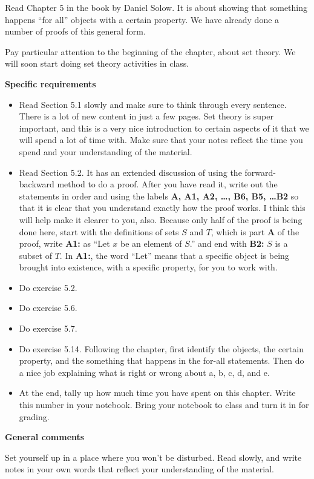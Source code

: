 
Read Chapter 5 in the book by Daniel Solow.
It is about showing that something happens ``for all'' objects with a certain property.
We have already done a number of proofs of this general form.

Pay particular attention to the beginning of the chapter, about set theory.
We will soon start doing set theory activities in class.

\vspace{0.1in}
\noindent
{\bf Specific requirements}
\vspace*{-0.15in}

\begin{itemize}
\item Read Section 5.1 slowly and make sure to think through every sentence.
There is a lot of new content in just a few pages.
Set theory is super important, and this is a very nice introduction to certain aspects of it that we will spend a lot of time with.
Make sure that your notes reflect the time you spend and your understanding of the material.

\item Read Section 5.2.  It has an extended discussion of using the forward-backward method to do a proof.
After you have read it, write out the statements in order and using the labels {\bf A, A1, A2, \ldots, B6, B5, \ldots B2} so that it is clear that you understand exactly how the proof works.
I think this will help make it clearer to you, also.
Because only half of the proof is being done here, start with the definitions of sets $S$ and $T$, which is part {\bf A} of the proof, write {\bf A1:} as ``Let $x$ be an element of $S$.'' and end with {\bf B2:} $S$ is a subset of $T$.
In {\bf A1:}, the word ``Let'' means that a specific object is being brought into existence, with a specific property, for you to work with.

\item Do exercise 5.2.

\item Do exercise 5.6.

\item Do exercise 5.7.

\item Do exercise 5.14.  Following the chapter, first identify the objects, the certain property, and the something that happens in the for-all statements.  Then do a nice job explaining what is right or wrong about a, b, c, d, and e.

\item At the end, tally up how much time you have spent on this chapter.
Write this number in your notebook.
Bring your notebook to class and turn it in for grading.
\end{itemize}

\noindent
{\bf General comments}

Set yourself up in a place where you won't be disturbed.
Read slowly, and write notes in your own words that reflect your understanding of the material.
